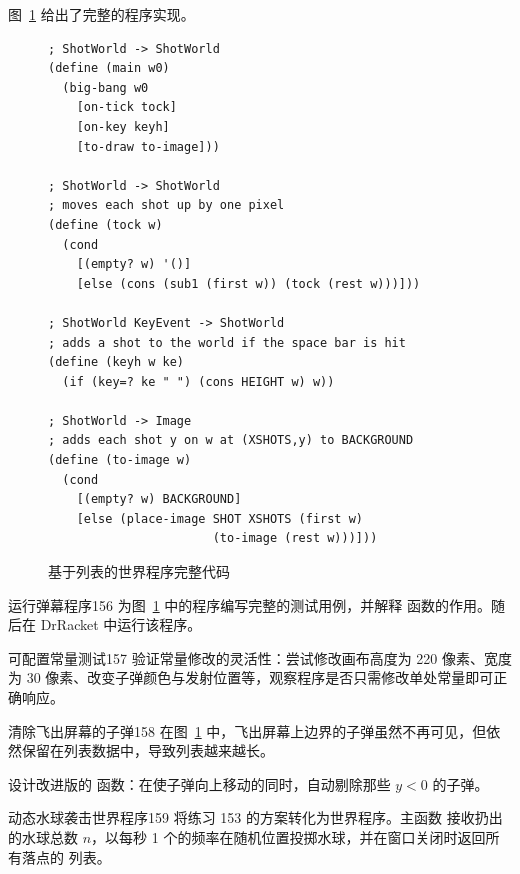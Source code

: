 图~\ref{fig:list_based_world_program} 给出了完整的程序实现。

\begin{figure}[htbp]
  \centering
\begin{lstlisting}[language=BSL, basicstyle=\scriptsize\ttfamily]
; ShotWorld -> ShotWorld
(define (main w0)
  (big-bang w0
    [on-tick tock]
    [on-key keyh]
    [to-draw to-image]))

; ShotWorld -> ShotWorld
; moves each shot up by one pixel
(define (tock w)
  (cond
    [(empty? w) '()]
    [else (cons (sub1 (first w)) (tock (rest w)))]))

; ShotWorld KeyEvent -> ShotWorld
; adds a shot to the world if the space bar is hit
(define (keyh w ke)
  (if (key=? ke " ") (cons HEIGHT w) w))

; ShotWorld -> Image
; adds each shot y on w at (XSHOTS,y) to BACKGROUND
(define (to-image w)
  (cond
    [(empty? w) BACKGROUND]
    [else (place-image SHOT XSHOTS (first w)
                       (to-image (rest w)))]))
\end{lstlisting}
  \caption{基于列表的世界程序完整代码}
  \label{fig:list_based_world_program}
\end{figure}

\begin{exercise}{运行弹幕程序}{156}
为图~\ref{fig:list_based_world_program} 中的程序编写完整的测试用例，并解释  函数的作用。随后在 DrRacket 中运行该程序。
\end{exercise}

\begin{exercise}{可配置常量测试}{157}
验证常量修改的灵活性：尝试修改画布高度为 220 像素、宽度为 30 像素、改变子弹颜色与发射位置等，观察程序是否只需修改单处常量即可正确响应。
\end{exercise}

\begin{exercise}{清除飞出屏幕的子弹}{158}
在图~\ref{fig:list_based_world_program} 中，飞出屏幕上边界的子弹虽然不再可见，但依然保留在列表数据中，导致列表越来越长。

设计改进版的  函数：在使子弹向上移动的同时，自动剔除那些 $y < 0$ 的子弹。
\end{exercise}

\begin{exercise}{动态水球袭击世界程序}{159}
将练习 153 的方案转化为世界程序。主函数  接收扔出的水球总数 $n$，以每秒 1 个的频率在随机位置投掷水球，并在窗口关闭时返回所有落点的  列表。
\end{exercise}

